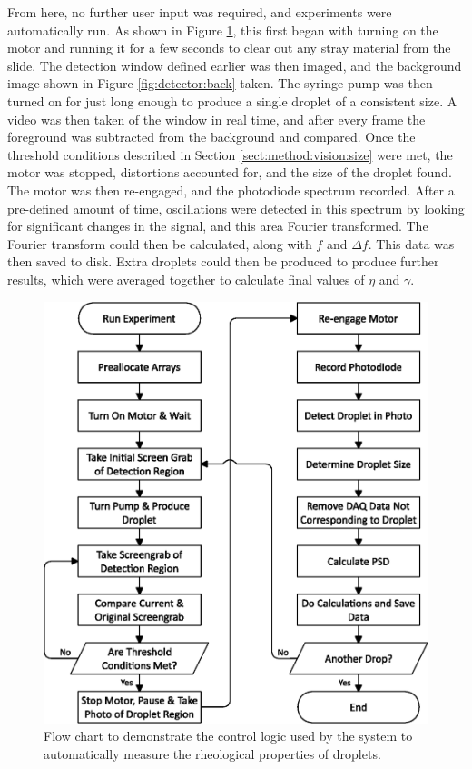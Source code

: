 \documentclass{physics_article_B}
\begin{document}
        From here, no further user input was required, and experiments were automatically run. As shown in Figure \ref{fig:setup:logic}, this first began with turning on the motor and running it for a few seconds to clear out any stray material from the slide. The detection window defined earlier was then imaged, and the background image shown in Figure \ref{fig:detector:back} taken. The syringe pump was then turned on for just long enough to produce a single droplet of a consistent size. A video was then taken of the window in real time, and after every frame the foreground was subtracted from the background and compared. Once the threshold conditions described in Section \ref{sect:method:vision:size} were met, the motor was stopped, distortions accounted for, and the size of the droplet found. The motor was then re-engaged, and the photodiode spectrum recorded. After a pre-defined amount of time, oscillations were detected in this spectrum by looking for significant changes in the signal, and this area Fourier transformed. The Fourier transform could then be calculated, along with $f$ and $\Delta f$. This data was then saved to disk. Extra droplets could then be produced to produce further results, which were averaged together to calculate final values of $\eta$ and $\gamma$.
    
        \begin{figure}[H]
            \centering
            \hspace*{-1cm}\includegraphics[scale=0.8]{Figures/FlowLogic.eps}
            \caption{Flow chart to demonstrate the control logic used by the system to automatically measure the rheological properties of droplets.}
            \label{fig:setup:logic}
        \end{figure}
\end{document}
